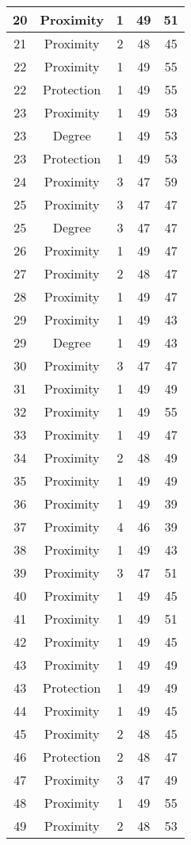 \documentclass[results.tex]{subfiles}
\begin{document}
\begin{center}
\begin{tabular}{| c || c | c | c | c |}
    \hline
    20 & Proximity & 1 & 49 & 51 \\ 
    \hline
    21 & Proximity & 2 & 48 & 45 \\ 
    \hline
    22 & Proximity & 1 & 49 & 55 \\ 
    \hline
    22 & Protection & 1 & 49 & 55 \\ 
    \hline
    23 & Proximity & 1 & 49 & 53 \\ 
    \hline
    23 & Degree & 1 & 49 & 53 \\ 
    \hline
    23 & Protection & 1 & 49 & 53 \\ 
    \hline
    24 & Proximity & 3 & 47 & 59 \\ 
    \hline
    25 & Proximity & 3 & 47 & 47 \\ 
    \hline
    25 & Degree & 3 & 47 & 47 \\ 
    \hline
    26 & Proximity & 1 & 49 & 47 \\ 
    \hline
    27 & Proximity & 2 & 48 & 47 \\ 
    \hline
    28 & Proximity & 1 & 49 & 47 \\ 
    \hline
    29 & Proximity & 1 & 49 & 43 \\ 
    \hline
    29 & Degree & 1 & 49 & 43 \\ 
    \hline
    30 & Proximity & 3 & 47 & 47 \\ 
    \hline
    31 & Proximity & 1 & 49 & 49 \\ 
    \hline
    32 & Proximity & 1 & 49 & 55 \\ 
    \hline
    33 & Proximity & 1 & 49 & 47 \\ 
    \hline
    34 & Proximity & 2 & 48 & 49 \\ 
    \hline
    35 & Proximity & 1 & 49 & 49 \\ 
    \hline
    36 & Proximity & 1 & 49 & 39 \\ 
    \hline
    37 & Proximity & 4 & 46 & 39 \\ 
    \hline
    38 & Proximity & 1 & 49 & 43 \\ 
    \hline
    39 & Proximity & 3 & 47 & 51 \\ 
    \hline
    40 & Proximity & 1 & 49 & 45 \\ 
    \hline
    41 & Proximity & 1 & 49 & 51 \\ 
    \hline
    42 & Proximity & 1 & 49 & 45 \\ 
    \hline
    43 & Proximity & 1 & 49 & 49 \\ 
    \hline
    43 & Protection & 1 & 49 & 49 \\ 
    \hline
    44 & Proximity & 1 & 49 & 45 \\ 
    \hline
    45 & Proximity & 2 & 48 & 45 \\ 
    \hline
    46 & Protection & 2 & 48 & 47 \\ 
    \hline
    47 & Proximity & 3 & 47 & 49 \\ 
    \hline
    48 & Proximity & 1 & 49 & 55 \\ 
    \hline
    49 & Proximity & 2 & 48 & 53 \\ 
    \hline   \end{tabular}
\end{center}
\end{document}
